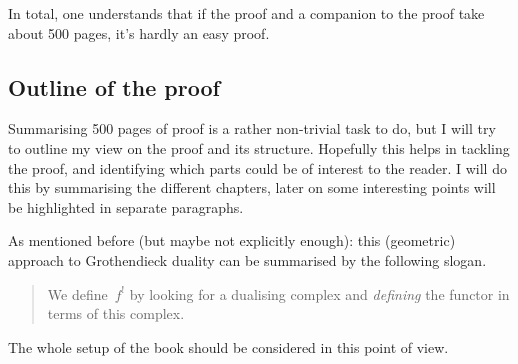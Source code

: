 \documentclass[10pt,a4paper]{article}
\begin{document}
In total, one understands that if the proof and a companion to the proof take about 500 pages, it's hardly an easy proof.

\subsection{Outline of the proof}
Summarising 500 pages of proof is a rather non-trivial task to do, but I will try to outline my view on the proof and its structure. Hopefully this helps in tackling the proof, and identifying which parts could be of interest to the reader. I will do this by summarising the different chapters, later on some interesting points will be highlighted in separate paragraphs.

As mentioned before (but maybe not explicitly enough): this (geometric) approach to Grothendieck duality can be summarised by the following slogan.
\begin{quote}
  We define~$f^!$ by looking for a dualising complex and \emph{defining} the functor in terms of this complex.
\end{quote}
The whole setup of the book should be considered in this point of view.
\end{document}
